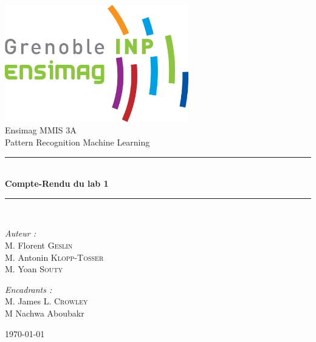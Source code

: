 \documentclass[a4paper,12pt, openany]{book}
\theoremstyle{break}
\begin{document}

\begin{titlepage}
\begin{center}

\includegraphics[width=0.6\textwidth]{ensimag_logo.png}\\[1cm]

{\large Ensimag MMIS 3A}\\[0.5cm]

{\large Pattern Recognition Machine Learning }\\[0.5cm]

\rule{\linewidth}{0.5mm} \\[0.4cm]
{ \huge \bfseries Compte-Rendu du lab 1\\[0.4cm] }
\rule{\linewidth}{0.5mm} \\[1.5cm]

\noindent
\begin{minipage}{0.4\textwidth}
  \begin{flushleft} \large
    \emph{Auteur :}\\
    M. Florent \textsc{Geslin} \\
    M. Antonin \textsc{Klopp-Tosser} \\
    M. Yoan \textsc{Souty} \\
  \end{flushleft}
\end{minipage}%
\begin{minipage}{0.4\textwidth}
  \begin{flushright} \large
    \emph{Encadrants :} \\
    M. James L. \textsc{Crowley}\\
    M Nachwa Aboubakr \\

  \end{flushright}
\end{minipage}

\vfill

{\large \today}

\end{center}
\end{titlepage}
\end{document}
